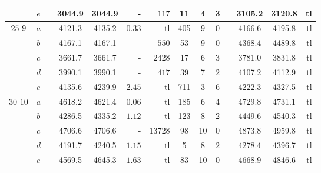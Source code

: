 \begin{table}[!htb]
\begin{tabular}{cccccrrccccccr}
& $e$ & & 3044.9 & 3044.9 & - & $117$ & 11 & 4 & 3 & & 3105.2 & 3120.8 & tl \\
\hline
\multirow{5}{*}{$25$  \hspace{5mm} $9$}
& $a$ & & 4121.3 & 4135.2 & $0.33$ & tl & 405 & 9 & 0 & & 4166.6 & 4195.8 & tl \\
& $b$ & & 4167.1 & 4167.1 & - & $550$ & 53 & 9 & 0 & & 4368.4 & 4489.8 & tl \\
& $c$ & & 3661.7 & 3661.7 & - & $2428$ & 17 & 6 & 3 & & 3781.0 & 3831.8 & tl \\
& $d$ & & 3990.1 & 3990.1 & - & $417$ & 39 & 7 & 2 & & 4107.2 & 4112.9 & tl \\
& $e$ & & 4135.6 & 4239.9 & $2.45$ & tl & 711 & 3 & 6 & & 4222.3 & 4327.5 & tl \\
\hline
\multirow{5}{*}{$30$  \hspace{4mm} $10$}
& $a$ & & 4618.2 & 4621.4 & $0.06$ & tl & 185 & 6 & 4 & & 4729.8 & 4731.1 & tl \\
& $b$ & & 4286.5 & 4335.2 & $1.12$ & tl & 123 & 8 & 2 & & 4449.6 & 4540.3 & tl \\
& $c$ & & 4706.6 & 4706.6 & - & $13728$ & 98 & 10 & 0 & & 4873.8 & 4959.8 & tl \\
& $d$ & & 4191.7 & 4240.5 & $1.15$ & tl & 5 & 8 & 2 & & 4278.4 & 4396.7 & tl \\
& $e$ & & 4569.5 & 4645.3 & $1.63$ & tl & 83 & 10 & 0 & & 4668.9 & 4846.6 & tl \\
\hline
\end{tabular}
\label{tab:PDPCDxVRPCD-custo10}
\end{table}
